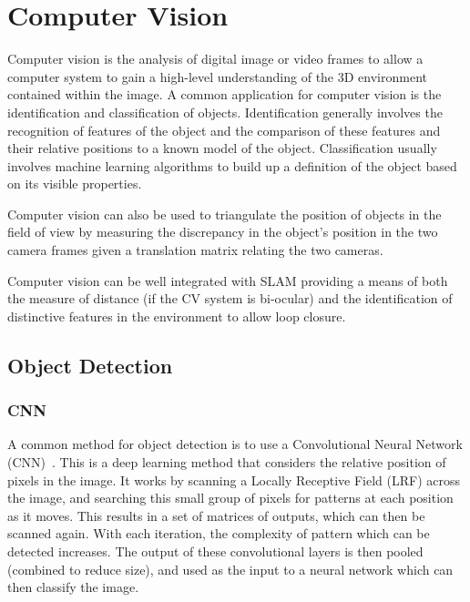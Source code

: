 \section{Computer Vision}\label{litreview/cv}
Computer vision is the analysis of digital image or video frames to allow a computer
system to gain a high-level understanding of the 3D environment contained within
the image\cite{CVBallard}. A common application for computer vision is the identification and classification
of objects. Identification generally involves the recognition of features of the
object and the comparison of these features and their relative positions to a
known model of the object. Classification usually involves machine learning
algorithms to build up a definition of the object based on its visible properties\cite{CVpaoletti2018new}.

Computer vision can also be used to triangulate the position of objects in the
field of view by measuring the discrepancy in the object's position in the two camera
frames given a translation matrix relating the two cameras.

Computer vision can be well integrated with SLAM providing a means of both the measure
of distance (if the CV system is bi-ocular) and the identification of distinctive
features in the environment to allow loop closure\cite{CVho2006loop}.
\subsection{Object Detection}\label{litreview/cv/objDet}
\subsubsection{CNN}\label{litreview/cv/objDet/CNN}
A common method for object detection is to use a Convolutional 
Neural Network (CNN)~\cite{schmidhuber2015deep}. This is a deep learning method that 
considers the relative position of pixels in the image. It 
works by scanning a Locally Receptive Field (LRF) across the 
image, and searching this small group of pixels for patterns 
at each position as it moves. This results in a set of 
matrices of outputs, which can then be scanned again. With 
each iteration, the complexity of pattern which can be detected 
increases. The output of these convolutional layers is then 
pooled (combined to reduce size), and used as the input to a 
neural network which can then classify the image.


